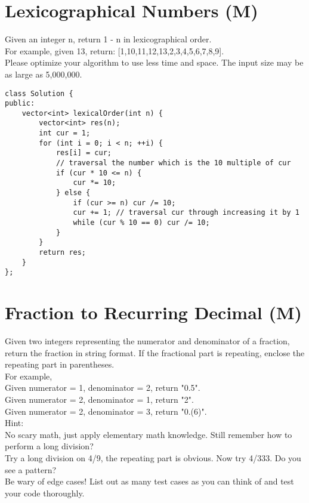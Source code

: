 \section{Lexicographical Numbers (M)}
Given an integer n, return 1 - n in lexicographical order.\\

For example, given 13, return: [1,10,11,12,13,2,3,4,5,6,7,8,9].\\

Please optimize your algorithm to use less time and space. The input size may be as large as 5,000,000. \\

\begin{lstlisting}
class Solution {
public:
    vector<int> lexicalOrder(int n) {
        vector<int> res(n);
        int cur = 1;
        for (int i = 0; i < n; ++i) {
            res[i] = cur;
            // traversal the number which is the 10 multiple of cur
            if (cur * 10 <= n) { 
                cur *= 10;
            } else {
                if (cur >= n) cur /= 10;
                cur += 1; // traversal cur through increasing it by 1
                while (cur % 10 == 0) cur /= 10;
            }
        }
        return res;
    }
};
\end{lstlisting}


\section{Fraction to Recurring Decimal (M)}
Given two integers representing the numerator and denominator of a fraction, return the fraction in string format. If the fractional part is repeating, enclose the repeating part in parentheses.\\

For example,\\
    Given numerator = 1, denominator = 2, return "0.5".\\
    Given numerator = 2, denominator = 1, return "2".\\
    Given numerator = 2, denominator = 3, return "0.(6)".\\

Hint:\\
    No scary math, just apply elementary math knowledge. Still remember how to perform a long division?\\
    Try a long division on 4/9, the repeating part is obvious. Now try 4/333. Do you see a pattern?\\
    Be wary of edge cases! List out as many test cases as you can think of and test your code thoroughly.\\


